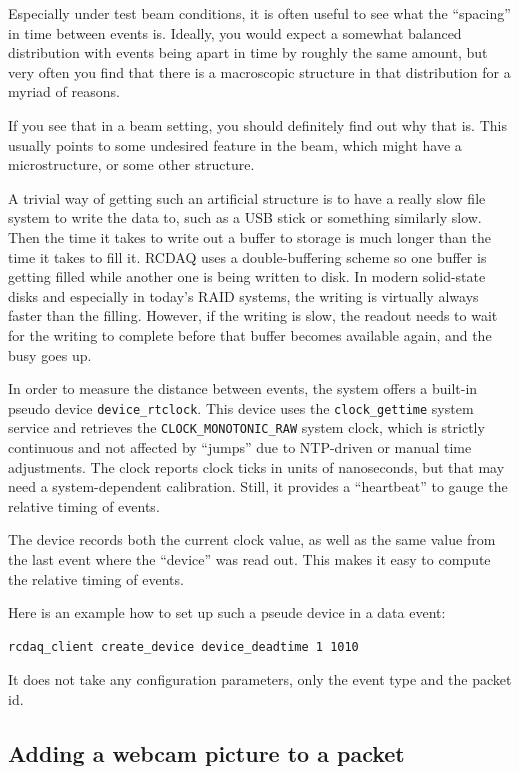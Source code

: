 \documentclass{article}[11pt]
\begin{document}
Especially under test beam conditions, it is often useful to see what
the ``spacing'' in time between events is. Ideally, you would expect a
somewhat balanced distribution with events being apart in time by
roughly the same amount, but very often you find that there is a
macroscopic structure in that distribution for a myriad of reasons.

If you see that in a beam setting, you should definitely find out why
that is. This usually points to some undesired feature in the beam,
which might have a microstructure, or some other structure. 

A trivial way of getting such an artificial structure is to have a
really slow file system to write the data to, such as a USB stick or
something similarly slow. Then the time it takes to write out a buffer to
storage is much longer than the time it takes to fill it. RCDAQ uses a
double-buffering scheme so one buffer is getting filled while 
another one is being written to disk. In modern solid-state disks and
especially in today's RAID systems, the writing is virtually always
faster than the filling. However, if the writing is slow, the readout
needs to wait for the writing to complete before that buffer becomes
available again, and the busy goes up.

In order to measure the distance between events, the system offers a
built-in pseudo device \verb|device_rtclock|. This device uses the
\verb|clock_gettime| system service and retrieves the
\verb|CLOCK_MONOTONIC_RAW| system clock, which is strictly continuous
and not affected by ``jumps'' due to NTP-driven or manual time
adjustments. The clock reports clock ticks in units of nanoseconds,
but that may need a system-dependent calibration. Still, it provides a
``heartbeat'' to gauge the relative timing of events. 

The device records both the current clock value, as well as the same
value from the last event where the ``device'' was read out. This
makes it easy to compute the relative timing of events.

Here is an example how to set up such a pseude device in a data event:

\begin{verbatim}
rcdaq_client create_device device_deadtime 1 1010
\end{verbatim}

It does not take any configuration parameters, only the event type and
the packet id.

\subsection{Adding a webcam picture to a packet}
\end{document}
